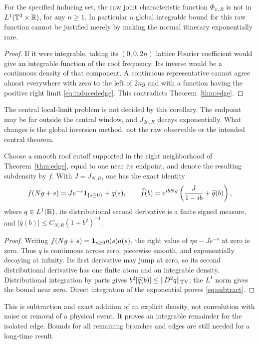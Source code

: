 \begin{corollary}\label{cor:nonLone}
For the specified inducing set, the raw joint characteristic function $\Phi_{n,R}$ is not in $L^1(\mathbb T^3\times\mathbb R)$, for any $n\ge1$. In particular a global integrable bound for this raw function cannot be justified merely by making the normal itinerary exponentially rare.
\end{corollary}
\begin{proof}
If it were integrable, taking its $(0,0,2n)$ lattice Fourier coefficient would give an integrable function of the roof frequency. Its inverse would be a continuous density of that component. A continuous representative cannot agree almost everywhere with zero to the left of $2ng$ and with a function having the positive right limit \eqref{eq:inducededge}. This contradicts Theorem~\ref{thm:edge}.
\end{proof}

The central local-limit problem is not decided by this corollary. The endpoint may be far outside the central window, and $J_{2n,R}$ decays exponentially. What changes is the global inversion method, not the raw observable or the intended central theorem.

\begin{proposition}\label{prop:subtract}
Choose a smooth roof cutoff supported in the right neighborhood of Theorem~\ref{thm:edge}, equal to one near its endpoint, and denote the resulting subdensity by $f$. With $J=J_{N,R}$, one has the exact identity
\begin{equation}\label{eq:subtract}
 f(Ng+s)=J e^{-s}\one_{\{s\ge0\}}+q(s),\qquad
 \widehat f(b)=e^{ibNg}\left(\frac{J}{1-ib}+\widehat q(b)\right),
\end{equation}
where $q\in L^1(\mathbb R)$, its distributional second derivative is a finite signed measure, and
$|\widehat q(b)|\le C_{N,R}(1+b^2)^{-1}$.
\end{proposition}
\begin{proof}
Writing $f(Ng+s)=\mathbf1_{s\ge0}\eta(s)a(s)$, the right value of $\eta a-Je^{-s}$ at zero is zero. Thus $q$ is continuous across zero, piecewise smooth, and exponentially decaying at infinity. Its first derivative may jump at zero, so its second distributional derivative has one finite atom and an integrable density. Distributional integration by parts gives $b^2|\widehat q(b)|\le\|D^2q\|_{\operatorname{TV}}$; the $L^1$ norm gives the bound near zero. Direct integration of the exponential proves \eqref{eq:subtract}.
\end{proof}
This is subtraction and exact addition of an explicit density, not convolution with noise or removal of a physical event. It proves an integrable remainder for the isolated edge. Bounds for all remaining branches and edges are still needed for a long-time result.

